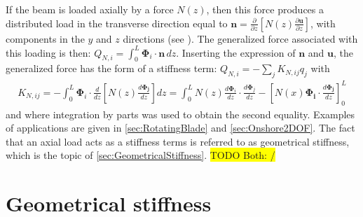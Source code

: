 \documentclass[wes, manuscript]{copernicus}
\renewcommand{\v}[1]{\boldsymbol{#1}}
\newcommand{\todoBoth}    [1]{{\colorbox{yellow}{TODO Both:    }}{\color{red}{#1}}\colorbox{yellow}{/}}
\begin{document}
If the beam is loaded axially by a force $N(z)$, then this force produces a distributed load in the transverse direction equal to $\v{n} = \frac{\partial}{\partial z}\left[N(z)\frac{\partial \v{u}}{\partial z}\right]$, with components in the $y$ and $z$ directions (see \cite{branlard:2019flex}).
The generalized force associated with this loading is then: $Q_{N,i}=\int_0^L \v{\Phi}_i\cdot \v{n}\, dz$.
Inserting the expression of $\v{n}$ and $\v{u}$, the generalized force has the form of a stiffness term: $Q_{N,i} =-\sum_j K_{N,ij} q_j$ with
\begin{align}
   K_{N,ij} = -\int_0^L \v{\Phi}_i \cdot \frac{d}{d z} \left[N(z) \frac{d \v{\Phi_j}}{d z}\right] dz  
       = \int_0^L N(z) \frac{d \v{\Phi}_i }{dz}\cdot \frac{d \v{\Phi}_j }{dz} - \left[N(x) \v{\Phi_i}\cdot \frac{d\v{\Phi_j}}{dz}\right]_0^L
   \label{eq:StiffnessAxial}
\end{align}
and where integration by parts was used to obtain the second equality.
Examples of applications are given in \autoref{sec:RotatingBlade} and \autoref{sec:Onshore2DOF}.
The fact that an axial load acts as a stiffness terms is referred to as geometrical stiffness, which is the topic of \autoref{sec:GeometricalStiffness}.
\todoBoth{maybe "induces", "causes" or "scales" instead of "acts"}





\section{Geometrical stiffness}
\label{sec:GeometricalStiffness}
\end{document}
